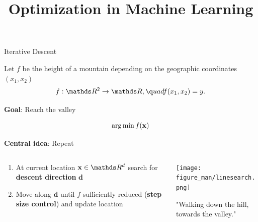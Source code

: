 \documentclass[11pt,compress,t,notes=noshow, xcolor=table]{beamer}
\title{Optimization in Machine Learning}
\date{}
\begin{document}
\sloppy

\begin{vbframe}{Iterative Descent}

	Let $f$ be the height of a mountain depending on the geographic coordinates $(x_1, x_2)$
	\vspace*{-0.1cm}
	$$
	f: \R^2 \to \R, \q     uad f(x_1, x_2) = y.
	$$
	
	\textbf{Goal}: Reach the valley

	$$
	\operatorname{arg\,min} f(\mathbf{x})
	$$
	
	\textbf{Central idea}: Repeat
	\vspace*{-0.15cm}
	\begin{columns}
		\begin{column}{0.58\textwidth}
			\begin{enumerate}
				\item At current location $\xv \in \R^d$ search for \textbf{descent direction} $\mathbf{d}$ 
			  	\item Move along $\mathbf{d}$ until $f$ sufficiently reduced (\textbf{step size control}) and update location
			\end{enumerate}
		\end{column}
		\begin{column}{0.4\textwidth}
			\begin{center}
			\texttt{[image: figure\_man/linesearch.png]}
			\hspace{2cm} \begin{footnotesize} "Walking down the hill, towards the valley." \end{footnotesize}\\
			\end{center}
		\end{column}
	\end{columns}
	
\end{vbframe}
\end{document}
